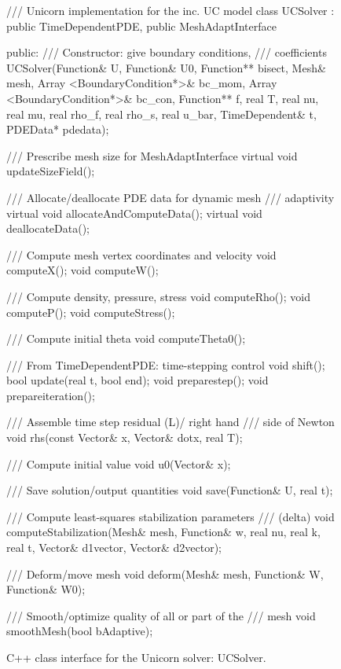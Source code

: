 \begin{figure}[!p]
\begin{c++}
/// Unicorn implementation for the inc. UC model
class UCSolver :
  public TimeDependentPDE, public MeshAdaptInterface
{
public:
  /// Constructor: give boundary conditions,
  /// coefficients
  UCSolver(Function& U, Function& U0,
           Function** bisect, Mesh& mesh,
           Array <BoundaryCondition*>& bc_mom,
           Array <BoundaryCondition*>& bc_con,
           Function** f, real T, real nu,
           real mu, real rho_f, real rho_s,
           real u_bar, TimeDependent& t,
           PDEData* pdedata);

  /// Prescribe mesh size for MeshAdaptInterface
  virtual void updateSizeField();

  /// Allocate/deallocate PDE data for dynamic mesh
  /// adaptivity
  virtual void allocateAndComputeData();
  virtual void deallocateData();

  /// Compute mesh vertex coordinates and velocity
  void computeX();
  void computeW();

  /// Compute density, pressure, stress
  void computeRho();
  void computeP();
  void computeStress();

  /// Compute initial theta
  void computeTheta0();

  /// From TimeDependentPDE: time-stepping control
  void shift();
  bool update(real t, bool end);
  void preparestep();
  void prepareiteration();

  /// Assemble time step residual (L)/ right hand
  /// side of Newton
  void rhs(const Vector& x, Vector& dotx, real T);

  /// Compute initial value
  void u0(Vector& x);

  /// Save solution/output quantities
  void save(Function& U, real t);

  /// Compute least-squares stabilization parameters
  /// (delta)
  void computeStabilization(Mesh& mesh, Function& w,
                            real nu, real k, real t,
                            Vector& d1vector,
                            Vector& d2vector);

  /// Deform/move mesh
  void deform(Mesh& mesh, Function& W, Function& W0);

  /// Smooth/optimize quality of all or part of the
  /// mesh
  void smoothMesh(bool bAdaptive);
}
\end{c++}
\caption{
C++ class interface for the Unicorn solver: UCSolver.
}
\label{code:UCSolver}
\end{figure}



